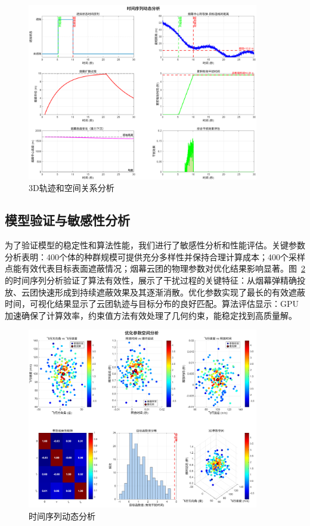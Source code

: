 \begin{figure}[htbp]
\centering
\includegraphics[width=0.9\textwidth]{figures/A_2_2.png}
\caption{3D轨迹和空间关系分析}
\label{fig:trajectory_3d}
\end{figure}

\subsection{模型验证与敏感性分析}

为了验证模型的稳定性和算法性能，我们进行了敏感性分析和性能评估。关键参数分析表明：400个体的种群规模可提供充分多样性并保持合理计算成本；400个采样点能有效代表目标表面遮蔽情况；烟幕云团的物理参数对优化结果影响显著。图~\ref{fig:time_series}的时间序列分析验证了算法有效性，展示了干扰过程的关键特征：从烟幕弹精确投放、云团快速形成到持续遮蔽效果及其逐渐消散。优化参数实现了最长的有效遮蔽时间，可视化结果显示了云团轨迹与目标分布的良好匹配。算法评估显示：GPU加速确保了计算效率，约束值方法有效处理了几何约束，能稳定找到高质量解。
\begin{figure}[htbp]
\centering
\includegraphics[width=0.9\textwidth]{figures/A_2_3.png}
\caption{时间序列动态分析}
\label{fig:time_series}
\end{figure}

